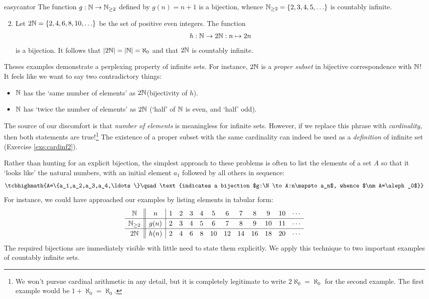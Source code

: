 \begin{examples}{}{easycantor}
	\exstart The function $g:\mathbb{N}\to\mathbb{N}_{\ge 2}$ defined by $g(n)=n+1$ is a bijection, whence $\mathbb{N}_{\ge 2}=\{2,3,4,5,\ldots\}$ is countably infinite.\footnotemark
	\begin{enumerate}\setcounter{enumi}{1}
	  \item Let $2\mathbb{N}=\{2,4,6,8,10,\ldots\}$ be the set of positive even integers. The function
		\[
			h:\mathbb{N}\to 2\mathbb{N}:n\mapsto 2n
		\]
		is a bijection. It follows that $\left| 2\mathbb{N}\right|=\left| \mathbb{N}\right|=\aleph_0$ and that $2\mathbb{N}$ is countably infinite.
	\end{enumerate}
\end{examples}


Theses examples demonstrate a perplexing property of infinite sets. For instance, $2\mathbb{N}$ is a \emph{proper subset} in bijective correspondence with $\mathbb{N}$! It feels like we want to say two contradictory things:
\begin{itemize}
  \item $\mathbb{N}$ has the `same number of elements' as $2\mathbb{N}$\quad (bijectivity of $h$).
  \item $\mathbb{N}$ has `twice the number of elements' as $2\mathbb{N}$ \quad (`half' of $\mathbb{N}$ is even, and `half' odd).
\end{itemize}
The source of our discomfort is that \emph{number of elements} is meaningless for infinite sets. However, if we replace this phrase with \emph{cardinality}, then both statements are true!\footnote{%
	We won't pursue cardinal arithmetic in any detail, but it is completely legitimate to write $2\aleph_0=\aleph_0$ for the second example. The first example would be $1+\aleph_0=\aleph_0$.%
} The existence of a proper subset with the same cardinality can indeed be used as a \emph{definition} of infinite set (Exercise \ref{exs:cardinf2}).\bigbreak


Rather than hunting for an explicit bijection, the simplest approach to these problems is often to list the elements of a set $A$ so that it `looks like' the natural numbers, with an initial element $a_1$ followed by all others in sequence:
\[
	\tcbhighmath{A=\{a_1,a_2,a_3,a_4,\ldots\}\quad \text{indicates a bijection $g:\N\to A:n\mapsto a_n$, whence $\nm A=\aleph_0$}}
\]
For instance, we could have approached our examples by listing elements in tabular form:
\[
	\def\arraystretch{1.2}
	\begin{array}{c||c|ccccccccccc}
 		\N&n&1&2&3&4&5&6&7&8&9&10&\cdots\\\hline
 		\N_{\ge 2}&g(n)&2&3&4&5&6&7&8&9&10&11&\cdots\\\hline
 		2\N&h(n)&2&4&6&8&10&12&14&16&18&20&\cdots
 	\end{array}
\]
The required bijections are immediately visible with little need to state them explicitly. We apply this technique to two important examples of countably infinite sets.


